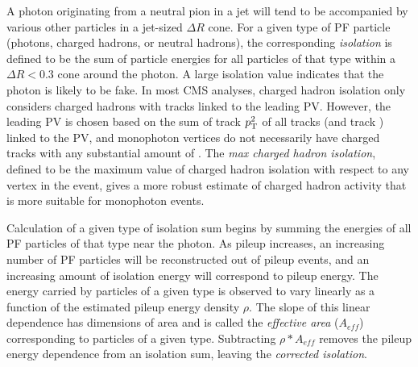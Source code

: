 A photon originating from a neutral pion in a jet will tend to be accompanied by various other particles in a jet-sized $\Delta R$ cone. For a given type of PF particle
(photons, charged hadrons, or neutral hadrons), the corresponding \textit{isolation} is defined to be the sum of particle energies for all particles of that type
within a $\Delta R < 0.3$ cone around the photon. A large isolation value indicates that the photon is likely to be fake.
In most CMS analyses, charged hadron isolation only considers charged hadrons with tracks linked to the leading PV. However,
the leading PV is chosen based on the sum of track $p_\mathrm{T}^{2}$ of all tracks (and track \MET) linked to the PV, and monophoton vertices do not necessarily have charged tracks
with any substantial amount of \pT. The \textit{max charged hadron isolation}, defined to be the maximum value of charged hadron isolation with respect to any vertex in the event,
gives a more robust estimate of charged hadron activity that is more suitable for monophoton events.

Calculation of a given type of isolation sum begins by summing the energies of all PF particles of that type near the photon. As pileup increases, an increasing number of PF particles
will be reconstructed out of pileup events, and an increasing amount of isolation energy will correspond to pileup energy. The energy carried by particles of a given type is observed to vary
linearly as a function of the estimated pileup energy density $\rho$. The slope of this linear dependence has dimensions of area and is called the \textit{effective area} ($A_{eff}$)
corresponding to particles of a given type. Subtracting $\rho{*}A_{eff}$ removes the pileup energy dependence from an isolation sum, leaving the \textit{corrected isolation}.

